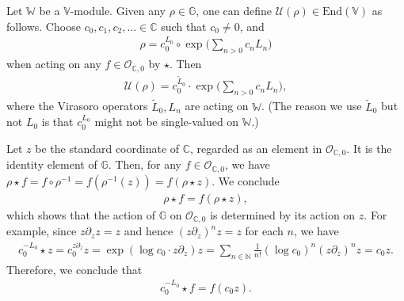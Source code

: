 \documentclass[12pt,a4paper,notitlepage]{report}
\theoremstyle{definition}
\theoremstyle{plain}
\newcommand{\mc}{\mathcal}
\newcommand{\wtd}{\widetilde}
\newcommand{\End}{\mathrm{End}} %
\newcommand{\scr}{\mathscr}
\newcommand{\mbb}{\mathbb}
\newcommand{\blt}{\bullet}
\newcommand{\Vbb}{\mathbb V}
\newcommand{\Wbb}{\mathbb W}
\newcommand{\Gbb}{\mathbb G}
\newcommand{\Cbb}{\mathbb C}
\newcommand{\Nbb}{\mathbb N}
\numberwithin{equation}{section}
\begin{document}
Let $\Wbb$ be a $\Vbb$-module. Given any $\rho\in\Gbb$, one can define $\mc U(\rho)\in\End(\Vbb)$ as follows. \index{U@$\mc U(\rho),\mc U(\eta_\blt)$} Choose $c_0,c_1,c_2,\dots\in\Cbb$ such that $c_0\neq 0$, and 
\begin{align}
\rho=c_0^{L_0}\circ \exp\Big(\sum_{n>0}c_n L_n\Big)\label{eq43}
\end{align}
when acting on any $f\in\scr O_{\Cbb,0}$ by $\star$. Then 
\begin{align}
\mc U(\rho)=c_0^{\wtd L_0}\cdot \exp\Big(\sum_{n>0}c_n L_n\Big),\label{eq46}
\end{align}
where the Virasoro operators $\wtd L_0,L_n$ are acting on $\Wbb$. (The reason we use $\wtd L_0$ but not $L_0$ is that $c_0^{L_0}$ might not be single-valued on $\Wbb$.) 

Let $z$ be the standard coordinate of $\mbb C$, regarded as an element in $\scr O_{\Cbb,0}$. It is the identity element of $\Gbb$. Then, for any $f\in\scr O_{\Cbb,0}$, we have $\rho\star f=f\circ\rho^{-1}=f(\rho^{-1}(z))=f(\rho\star z)$. We conclude
\begin{align}
\rho\star f=f(\rho\star z),\label{eq44}
\end{align}
which shows that the action of $\Gbb$ on $\scr O_{\Cbb,0}$ is determined by its action on $z$. For example, since $z\partial_z z=z$ and hence $(z\partial_z)^nz=z$ for each $n$, we have
\begin{align*}
c_0^{-L_0}\star z=c_0^{z\partial_z}z=\exp(\log c_0\cdot z\partial_z)z=\sum_{n\in\Nbb}\frac 1{n!}(\log c_0)^n(z\partial_z)^n z=c_0z.
\end{align*}
Therefore, we conclude that
\begin{align}
c_0^{-L_0}\star f=f(c_0z).
\end{align}
\end{document}
